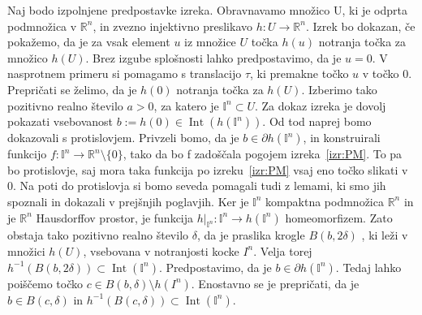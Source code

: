 \documentclass[mat1]{fmfdelo}
\newcommand{\R}{\mathbb R}
\DeclareMathOperator{\Int}{Int}
\newcommand{\I}{\mathbb I}
\newcommand{\0}{0}
\begin{document}
\begin{dokaz}
Naj bodo izpolnjene predpostavke izreka. Obravnavamo množico U, ki je odprta podmnožica v $\R^n$, in zvezno injektivno preslikavo $h : U \rightarrow \R^n$. Izrek bo dokazan, če pokažemo, da je za vsak element $u$ iz množice $U$ točka $h(u)$ notranja točka za množico $h(U)$. Brez izgube splošnosti lahko predpostavimo, da je $u=0$. V nasprotnem primeru si pomagamo s translacijo $\tau$, ki premakne točko $u$ v točko $0$. %
Prepričati se želimo, da je $h(\0)$ notranja točka za $h(U)$. Izberimo tako pozitivno realno število $a > 0$, za katero je $\I^n \subset U$. Za dokaz izreka je dovolj pokazati vsebovanost $b := h(\0) \in \Int(h(\I^n))$. Od tod naprej bomo dokazovali s protislovjem. Privzeli bomo, da je $b \in \partial h(\I^n)$, in konstruirali funkcijo $f : \I^n \to \R^n \setminus \{ \0 \}$, tako da bo f zadoščala pogojem izreka~\ref{izr:PM}. To pa bo protislovje, saj mora taka funkcija po izreku~\ref{izr:PM} vsaj eno točko slikati v $0$. Na poti do protislovja si bomo seveda pomagali tudi z lemami, ki smo jih spoznali in dokazali v prejšnjih poglavjih. Ker je $\I^n$ kompaktna podmnožica $\R^n$ in je $\R^n$ Hausdorffov prostor, je funkcija $h|_{\I^n} : \I^n \to h\left(\I^n  \right)$ homeomorfizem. Zato obstaja tako pozitivno realno število $\delta$, da je praslika krogle $B(b, 2 \delta)$
, ki leži v množici $h(U)$, vsebovana v notranjosti kocke $I^n$. Velja torej $h^{-1}(B(b, 2 \delta)) \subset \Int(\I^n)$. Predpostavimo, da je $b \in \partial h\left(\I^n\right)$. Tedaj lahko poiščemo točko $c \in B(b, \delta) \setminus h(I^n)$. Enostavno se je prepričati, da je $b \in B(c, \delta)$ in $h^{-1} (B(c, \delta)) \subset \Int (\I^n)$.


\end{dokaz}
\end{document}
